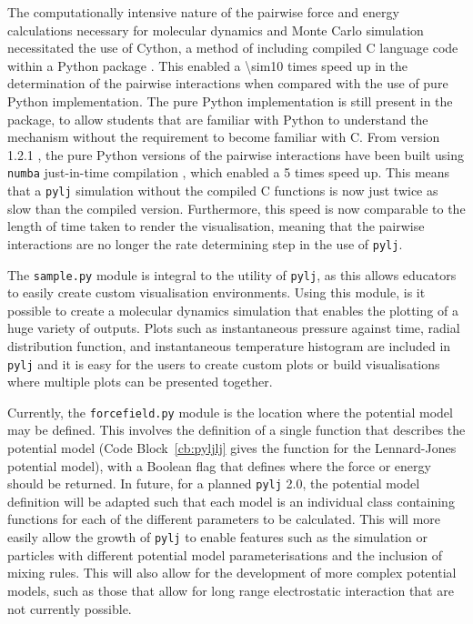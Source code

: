 The computationally intensive nature of the pairwise force and energy calculations necessary for molecular dynamics and Monte Carlo simulation necessitated the use of Cython, a method of including compiled C language code within a Python package \cite{noauthor_cython_nodate}.
This enabled a \num{\sim10} times speed up in the determination of the pairwise interactions when compared with the use of pure Python implementation.
The pure Python implementation is still present in the package, to allow students that are familiar with Python to understand the mechanism without the requirement to become familiar with C.
From version 1.2.1 \cite{mccluskey_arm61/pylj_2019-1}, the pure Python versions of the pairwise interactions have been built using \texttt{numba} just-in-time compilation \cite{noauthor_numba_nodate}, which enabled a \num{5} times speed up.
This means that a \texttt{pylj} simulation without the compiled C functions is now just twice as slow than the compiled version.
Furthermore, this speed is now comparable to the length of time taken to render the visualisation, meaning that the pairwise interactions are no longer the rate determining step in the use of \texttt{pylj}.

The \texttt{sample.py} module is integral to the utility of \texttt{pylj}, as this allows educators to easily create custom visualisation environments.
Using this module, is it possible to create a molecular dynamics simulation that enables the plotting of a huge variety of outputs.
Plots such as instantaneous pressure against time, radial distribution function, and instantaneous temperature histogram are included in \texttt{pylj} and it is easy for the users to create custom plots or build visualisations where multiple plots can be presented together.

Currently, the \texttt{forcefield.py} module is the location where the potential model may be defined.
This involves the definition of a single function that describes the potential model (Code Block~\ref{cb:pyljlj} gives the function for the Lennard-Jones potential model), with a Boolean flag that defines where the force or energy should be returned.
In future, for a planned \texttt{pylj} \num{2.0}, the potential model definition will be adapted such that each model is an individual class containing functions for each of the different parameters to be calculated.
This will more easily allow the growth of \texttt{pylj} to enable features such as the simulation or particles with different potential model parameterisations and the inclusion of mixing rules.
This will also allow for the development of more complex potential models, such as those that allow for long range electrostatic interaction that are not currently possible.
%
\begin{figure}
    \centering
        
\end{figure}
%

